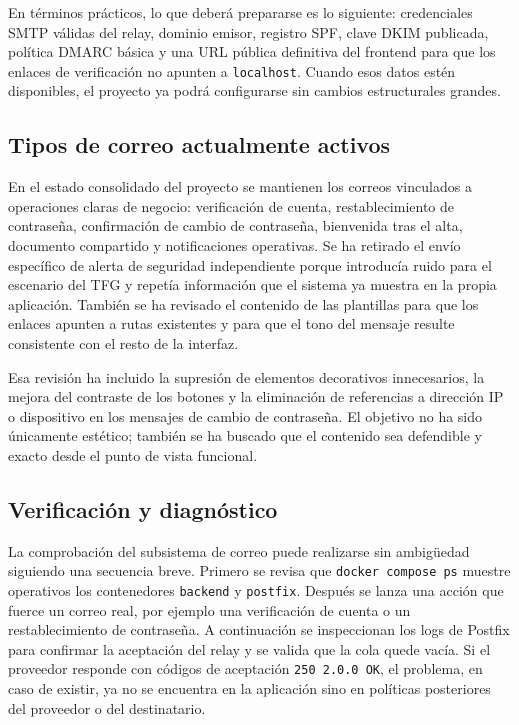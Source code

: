 \documentclass[11pt, a4paper]{article}
\begin{document}
En términos prácticos, lo que deberá prepararse es lo siguiente: credenciales SMTP válidas del relay, dominio emisor, registro SPF, clave DKIM publicada, política DMARC básica y una URL pública definitiva del frontend para que los enlaces de verificación no apunten a \texttt{localhost}. Cuando esos datos estén disponibles, el proyecto ya podrá configurarse sin cambios estructurales grandes.

\subsection{Tipos de correo actualmente activos}

En el estado consolidado del proyecto se mantienen los correos vinculados a operaciones claras de negocio: verificación de cuenta, restablecimiento de contraseña, confirmación de cambio de contraseña, bienvenida tras el alta, documento compartido y notificaciones operativas. Se ha retirado el envío específico de alerta de seguridad independiente porque introducía ruido para el escenario del TFG y repetía información que el sistema ya muestra en la propia aplicación. También se ha revisado el contenido de las plantillas para que los enlaces apunten a rutas existentes y para que el tono del mensaje resulte consistente con el resto de la interfaz.

Esa revisión ha incluido la supresión de elementos decorativos innecesarios, la mejora del contraste de los botones y la eliminación de referencias a dirección IP o dispositivo en los mensajes de cambio de contraseña. El objetivo no ha sido únicamente estético; también se ha buscado que el contenido sea defendible y exacto desde el punto de vista funcional.

\subsection{Verificación y diagnóstico}

La comprobación del subsistema de correo puede realizarse sin ambigüedad siguiendo una secuencia breve. Primero se revisa que \texttt{docker compose ps} muestre operativos los contenedores \texttt{backend} y \texttt{postfix}. Después se lanza una acción que fuerce un correo real, por ejemplo una verificación de cuenta o un restablecimiento de contraseña. A continuación se inspeccionan los logs de Postfix para confirmar la aceptación del relay y se valida que la cola quede vacía. Si el proveedor responde con códigos de aceptación \texttt{250 2.0.0 OK}, el problema, en caso de existir, ya no se encuentra en la aplicación sino en políticas posteriores del proveedor o del destinatario.
\end{document}
